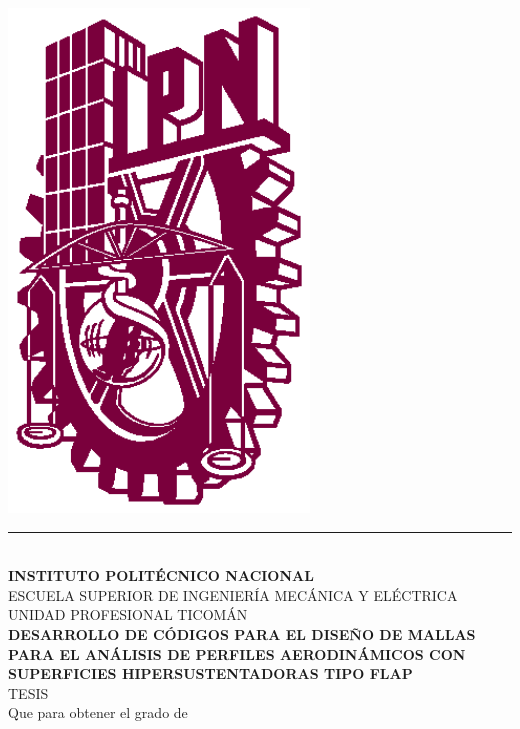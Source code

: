\documentclass[letterpaper, openright, 12pt]{book}
\begin{document}
    \begin{titlepage}
        \begin{center}
                \includegraphics[keepaspectratio, width=80mm]{./img/ipn_logo}
        \vspace*{2mm}
        \rule{\textwidth}{1.5pt}\\
        \vspace*{2mm}
        \textbf{INSTITUTO POLITÉCNICO NACIONAL}\\
        \vspace*{3mm}
        ESCUELA SUPERIOR DE INGENIERÍA MECÁNICA Y ELÉCTRICA\\
        UNIDAD PROFESIONAL TICOMÁN\\
        \vspace{12mm}
        \textbf{DESARROLLO DE CÓDIGOS PARA EL DISEÑO DE MALLAS PARA EL
        ANÁLISIS DE PERFILES AERODINÁMICOS CON SUPERFICIES HIPERSUSTENTADORAS
    TIPO FLAP}\\
        \vspace*{12mm}
        TESIS\\
        Que para obtener el grado de\\
        \vspace{3mm}

\end{center}
\end{titlepage}
\end{document}
